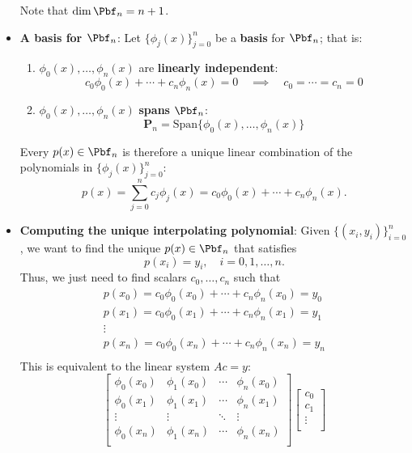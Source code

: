 \documentclass{report}
\begin{document}
\begin{itemize}
\begin{enumerate}
        \end{enumerate}
        Note that $\dim \Pbf_n = n+1$.
    \item \textbf{A basis for $\Pbf_n$}:
        Let $\big\{\phi_j(x)\big\}_{j=0}^n$ be a \textbf{basis} for $\Pbf_n$; that is:
        \begin{enumerate}
            \item $\phi_0(x), \ldots, \phi_n(x)$ are \textbf{linearly independent}:
            $$
            c_0 \phi_0(x) + \cdots + c_n \phi_n(x) = 0
            \quad \implies \quad
            c_0 = \cdots = c_n = 0
            $$
        \item $\phi_0(x), \ldots, \phi_n(x)$ \textbf{spans} $\Pbf_n$:
            $$
            \mathbf{P}_n = \text{Span}\big\{\phi_0(x),\ldots,\phi_n(x)\big\}
            $$
        \end{enumerate}
        Every $p(x) \in \Pbf_n$ is therefore a unique linear combination of the polynomials in $\big\{\phi_j(x)\big\}_{j=0}^n$:
        $$p(x) = \sum_{j=0}^n c_j \phi_j(x) = c_0 \phi_0(x) + \cdots + c_n \phi_n(x).$$
    \item \textbf{Computing the unique interpolating polynomial}:
        Given $\big\{(x_i, y_i)\big\}_{i=0}^n$, we want to find the unique $p(x) \in \Pbf_n$ that satisfies
$$p(x_i) = y_i, \quad i = 0, 1, \ldots, n.$$
Thus, we just need to find scalars $c_0,\ldots,c_n$ such that
\begin{align*}
    p(x_0) = c_0 \phi_0(x_0) + \cdots + c_n \phi_n(x_0) = y_0\\
    p(x_1) = c_0 \phi_0(x_1) + \cdots + c_n \phi_n(x_1) = y_1\\
    \vdots\\
    p(x_n) = c_0 \phi_0(x_n) + \cdots + c_n \phi_n(x_n) = y_n\\
\end{align*}
This is equivalent to the linear system $A c = y$:
$$
\begin{bmatrix}
\phi_0(x_0) & \phi_1(x_0) & \cdots & \phi_n(x_0)\\
\phi_0(x_1) & \phi_1(x_1) & \cdots & \phi_n(x_1)\\
\vdots & \vdots & \ddots & \vdots\\
\phi_0(x_n) & \phi_1(x_n) & \cdots & \phi_n(x_n)\\
\end{bmatrix}
\begin{bmatrix}
c_0\\
c_1\\
\vdots\\

\end{bmatrix}$$
\end{itemize}
\end{document}
